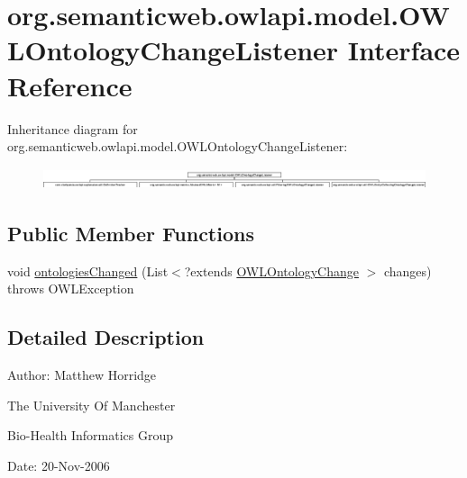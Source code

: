 \hypertarget{interfaceorg_1_1semanticweb_1_1owlapi_1_1model_1_1_o_w_l_ontology_change_listener}{\section{org.\-semanticweb.\-owlapi.\-model.\-O\-W\-L\-Ontology\-Change\-Listener Interface Reference}
\label{interfaceorg_1_1semanticweb_1_1owlapi_1_1model_1_1_o_w_l_ontology_change_listener}
}
Inheritance diagram for org.\-semanticweb.\-owlapi.\-model.\-O\-W\-L\-Ontology\-Change\-Listener\-:\begin{figure}[H]
\begin{center}
\leavevmode
\includegraphics[height=0.645161cm]{interfaceorg_1_1semanticweb_1_1owlapi_1_1model_1_1_o_w_l_ontology_change_listener}
\end{center}
\end{figure}
\subsection*{Public Member Functions}
\begin{DoxyCompactItemize}
\item 
void \hyperlink{interfaceorg_1_1semanticweb_1_1owlapi_1_1model_1_1_o_w_l_ontology_change_listener_a1b799247b850f5731783b5b7167a8642}{ontologies\-Changed} (List$<$?extends \hyperlink{classorg_1_1semanticweb_1_1owlapi_1_1model_1_1_o_w_l_ontology_change}{O\-W\-L\-Ontology\-Change} $>$ changes)  throws O\-W\-L\-Exception
\end{DoxyCompactItemize}


\subsection{Detailed Description}
Author\-: Matthew Horridge\par
 The University Of Manchester\par
 Bio-\/\-Health Informatics Group\par
 Date\-: 20-\/\-Nov-\/2006\par
\par
 

